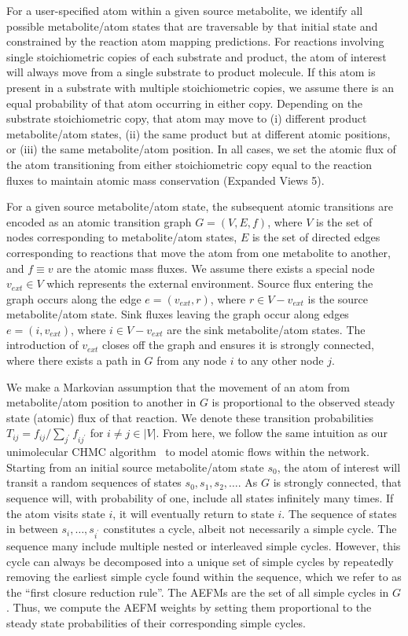 \documentclass[12pt]{article}
\begin{document}
For a user-specified atom within a given source metabolite, we identify
all possible metabolite/atom states that are traversable by that initial
state and constrained by the reaction atom mapping predictions. For
reactions involving single stoichiometric copies of each substrate and
product, the atom of interest will always move from a single substrate to
product molecule. If this atom is present in a substrate with multiple
stoichiometric copies, we assume there is an equal probability of that
atom occurring in either copy. Depending on the substrate stoichiometric
copy, that atom may move to (i) different product metabolite/atom states,
(ii) the same product but at different atomic positions, or (iii) the same
metabolite/atom position. In all cases, we set the atomic flux of the atom
transitioning from either stoichiometric copy equal to the reaction fluxes
to maintain atomic mass conservation (Expanded Views 5).

For a given source metabolite/atom state, the subsequent atomic
transitions are encoded as an atomic transition graph $G = (V, E, f)$,
where $V$ is the set of nodes corresponding to
metabolite/atom states, $E$ is the set of directed edges corresponding to
reactions that move the atom from one metabolite to another, and $f \equiv
v$ are the atomic mass fluxes. We assume there exists a special node $v_{ext} \in V$
which represents the external environment. Source flux entering the graph
occurs along the edge $e = (v_{ext}, r)$, where $r \in V - v_{ext}$ is the
source metabolite/atom state. Sink fluxes leaving the graph occur along
edges $e = (i, v_{ext})$, where $i \in V - v_{ext}$ are the sink
metabolite/atom states. The introduction of $v_{ext}$ closes off the graph
and ensures it is strongly connected, where there exists a path in $G$
from any node $i$ to any other node $j$.

We make a Markovian assumption that the movement of an atom from
metabolite/atom position to another in $G$ is proportional to the observed
steady state (atomic) flux of that reaction. We denote these transition
probabilities $T_{ij} = f_{ij} / \sum_{j^{\prime}}f_{ij^{\prime}}$ for $i
\neq j \in |V|$. From here, we follow the same intuition as our
unimolecular CHMC algorithm~\citep{ChitpinJustinG2023AMct} to model atomic
flows within the network. Starting from an initial source metabolite/atom
state $s_0$, the atom of interest will transit a random sequences of
states $s_0, s_1, s_2, \ldots$. As $G$ is strongly connected, that
sequence will, with probability of one, include all states infinitely many
times. If the atom visits state $i$, it will eventually return to state
$i$. The sequence of states in between $s_i, \ldots, s_{i^{\prime}}$
constitutes a cycle, albeit not necessarily a simple cycle. The sequence
many include multiple nested or interleaved simple cycles. However, this
cycle can always be decomposed into a unique set of simple cycles by
repeatedly removing the earliest simple cycle found within the sequence,
which we refer to as the ``first closure reduction rule''. The AEFMs are
the set of all simple cycles in $G$. Thus, we compute the AEFM
weights by setting them proportional to the steady state probabilities of
their corresponding simple cycles.
\end{document}
